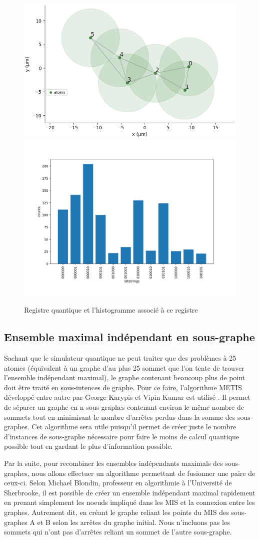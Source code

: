 \documentclass[11pt]{article}
\begin{document}
\begin{figure}[H]
    \centering
    \includegraphics[width = 0.48\linewidth]{images/registre_exemple2.png}
    \includegraphics[width=0.49\linewidth]{images/histogram_exemple2.png}
    \caption{Registre quantique et l'histogramme associé à ce registre}
    \label{QMIS_exemple}
\end{figure}



\subsection{Ensemble maximal indépendant en sous-graphe}
Sachant que le simulateur quantique ne peut traiter que des problèmes à 25 atomes (équivalent à un graphe d'au plus 25 sommet que l'on tente de trouver l'ensemble indépendant maximal), le graphe contenant beaucoup plus de point doit être traité en sous-intences de graphe. Pour ce faire, l'algorithme METIS développé entre autre par George Karypis et Vipin Kumar est utilisé \cite{karypis_multilevelk-way_1998}. Il permet de séparer un graphe en n sous-graphes contenant environ le même nombre de sommets tout en minimisant le nombre d'arrêtes perdus dans la somme des sous-graphes. Cet algorithme sera utile puisqu'il permet de créer juste le nombre d'instances de sous-graphe nécessaire pour faire le moins de calcul quantique possible tout en gardant le plus d'information possible. 

Par la suite, pour recombiner les ensembles indépendants maximals des sous-graphes, nous allons effectuer un algorithme permettant de fusionner une paire de ceux-ci. Selon Michael Blondin, professeur en algorithmie à l'Université de Sherbrooke, il est possible de créer un ensemble indépendant maximal rapidement en prenant simplement les noeuds impliqué dans les MIS et la connexion entre les graphes. Autrement dit, en créant le graphe reliant les points du MIS des sous-graphes A et B selon les arrêtes du graphe initial. Nous n'incluons pas les sommets qui n'ont pas d'arrêtes reliant un sommet de l'autre sous-graphe.
\end{document}
